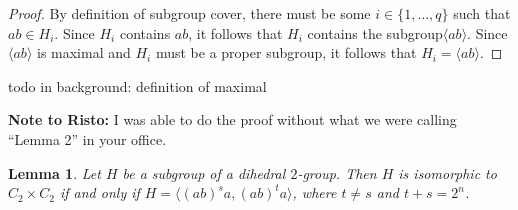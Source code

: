 \documentclass{amsart}
\numberwithin{equation} {section}
\newtheorem{lemma}[equation]{Lemma}
\newtheorem{proposition}[equation]{Proposition}
\theoremstyle{definition}
\begin{document}
\begin{proof}
By definition of subgroup cover, there must be some $i \in \{1,\ldots, q\}$ such that $ab\in H_i$. Since $H_i$ contains $ab$, it follows that $H_i$ contains the subgroup$\langle ab \rangle$. Since $\langle ab \rangle$ is maximal and $H_i$ must be a proper subgroup, it follows that $H_i = \langle ab \rangle$. 
\end{proof}

todo in background: definition of maximal 

\textbf{Note to Risto:} I was able to do the proof without what we were calling ``Lemma 2'' in your office. 

\begin{comment}
This was originally included as a Lemma, but I no longer feel it is necessary. 

\begin{proposition}\label{p:how-to-cover-reflections}
Le $B = \{(ab)^ja \mid 0 \leq j \leq 2^{n-1} \}$. Let $\mathcal{C}$ be a collection of subgroups of $D(2^n)$. Then $\mathcal{C}$ is a minimal powerful subgroup cover of $B$ if and only if removing the subgroup $\langle ab \rangle$ from $C$ results in a minimal powerful subgroup cover of $D(2^n)$. 
\end{proposition}

\begin{proof}
todo. 
\end{proof}
\end{comment}

\begin{lemma}\label{l:copies-of-C2-times-C2}
Let $H$ be a subgroup of a dihedral $2$-group. Then $H$ is isomorphic to $C_2 \times C_2$ if and only if $H = \langle (ab)^sa, (ab)^ta \rangle$, where $t \neq s$ and $t + s = 2^n$.
\end{lemma}
\end{document}
